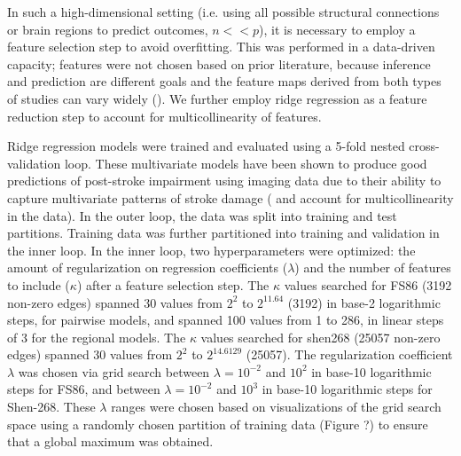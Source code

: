 \documentclass[10pt]{article}
\begin{document}
In such a high-dimensional setting (i.e. using all possible structural connections or brain regions to predict outcomes, $n<<p$), it is necessary to employ a feature selection step to avoid overfitting. This was performed in a data-driven capacity; features were not chosen based on prior literature, because inference and prediction are different goals and the feature maps derived from both types of studies can vary widely (\cite{Sperber2021-lw, Bzdok2020-py}). We further employ ridge regression as a feature reduction step to account for multicollinearity of features. 

Ridge regression models were trained and evaluated using a 5-fold nested cross-validation loop. These multivariate models have been shown to produce good predictions of post-stroke impairment using imaging data due to their ability to capture multivariate patterns of stroke damage (\cite{Salvalaggio2020-pe} and account for multicollinearity in the data). In the outer loop, the data was split into training and test partitions. Training data was further partitioned into training and validation in the inner loop. In the inner loop, two hyperparameters were optimized: the amount of regularization on regression coefficients ($\lambda$) and the number of features to include ($\kappa$) after a feature selection step. The $\kappa$ values searched for FS86 (3192 non-zero edges) spanned 30 values from $2^2$ to $2^{11.64}$ (3192) in base-2 logarithmic steps, for pairwise models, and spanned 100 values from 1 to 286, in linear steps of 3 for the regional models. The $\kappa$ values searched for shen268  (25057 non-zero edges) spanned 30 values from $2^2$ to $2^{14.6129}$ (25057). The regularization coefficient $\lambda$ was chosen via grid search between $\lambda = 10^{-2}$ and $10^2$ in base-10 logarithmic steps for FS86, and between $\lambda = 10^{-2}$ and $10^3$ in base-10 logarithmic steps for Shen-268. These $\lambda$ ranges were chosen based on visualizations of the grid search space using a randomly chosen partition of training data (Figure ?) to ensure that a global maximum was obtained.
\end{document}
